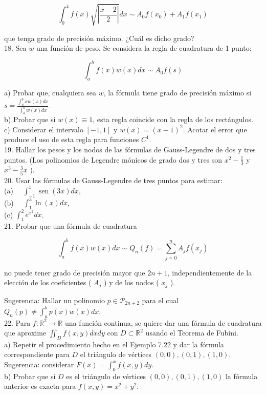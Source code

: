 \documentclass[10pt]{book}
\begin{document}
$$
\int_{0}^{4} f(x) \sqrt{\left|\frac{x-2}{2}\right|} d x \sim A_{0} f\left(x_{0}\right)+A_{1} f\left(x_{1}\right)
$$

que tenga grado de precisión máximo. ¿Cuál es dicho grado?\\
18. Sea $w$ una función de peso. Se considera la regla de cuadratura de 1 punto:

$$
\int_{a}^{b} f(x) w(x) d x \sim A_{0} f(s)
$$

a) Probar que, cualquiera sea $w$, la fórmula tiene grado de precisión máximo si $s= \frac{\int_{a}^{b} x w(x) d x}{\int_{a}^{b} w(x) d x}$.\\
b) Probar que si $w(x) \equiv 1$, esta regla coincide con la regla de los rectángulos.\\
c) Considerar el intervalo $[-1,1]$ y $w(x)=(x-1)^{2}$. Acotar el error que produce el uso de esta regla para funciones $C^{1}$.\\
19. Hallar los pesos y los nodos de las fórmulas de Gauss-Legendre de dos y tres puntos. (Los polinomios de Legendre mónicos de grado dos y tres son $x^{2}-\frac{1}{3}$ y $x^{3}-\frac{3}{5} x$ ).\\
20. Usar las fórmulas de Gauss-Legendre de tres puntos para estimar:\\
(a) $\quad \int_{-1}^{1} \operatorname{sen}(3 x) d x$,\\
(b) $\quad \int_{1}^{3} \ln (x) d x$,\\
(c) $\int_{1}^{2} e^{x^{2}} d x$.\\
21. Probar que una fórmula de cuadratura

$$
\int_{a}^{b} f(x) w(x) d x \sim Q_{n}(f)=\sum_{j=0}^{n} A_{j} f\left(x_{j}\right)
$$

no puede tener grado de precisión mayor que $2 n+1$, independientemente de la elección de los coeficientes ( $A_{j}$ ) y de los nodos ( $x_{j}$ ).

Sugerencia: Hallar un polinomio $p \in \mathcal{P}_{2 n+2}$ para el cual $Q_{n}(p) \neq \int_{a}^{b} p(x) w(x) d x$.\\
22. Para $f: \mathbb{R}^{2} \rightarrow \mathbb{R}$ una función continua, se quiere dar una fórmula de cuadratura que aproxime $\iint_{D} f(x, y) d x d y$ con $D \subset \mathbb{R}^{2}$ usando el Teorema de Fubini.\\
a) Repetir el procedimiento hecho en el Ejemplo 7.22 y dar la fórmula correspondiente para $D$ el triángulo de vértices $(0,0),(0,1),(1,0)$.\\
Sugerencia: considerar $F(x)=\int_{0}^{x} f(x, y) d y$.\\
b) Probar que si $D$ es el triángulo de vértices $(0,0),(0,1),(1,0)$ la fórmula anterior es exacta para $f(x, y)=x^{2}+y^{2}$.
\end{document}

